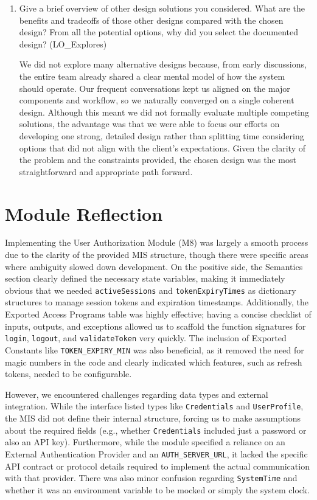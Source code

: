 \documentclass[12pt, titlepage]{article}
\begin{document}
\begin{enumerate}
  \item Give a brief overview of other design solutions you considered.  What
  are the benefits and tradeoffs of those other designs compared with the chosen
  design?  From all the potential options, why did you select the documented design?
  (LO\_Explores)

    \hspace{2em} We did not explore many alternative designs because, from early discussions, the entire team already shared a clear mental model of how the system should operate. Our frequent conversations kept us aligned on the major components and workflow, so we naturally converged on a single coherent design. Although this meant we did not formally evaluate multiple competing solutions, the advantage was that we were able to focus our efforts on developing one strong, detailed design rather than splitting time considering options that did not align with the client’s expectations. Given the clarity of the problem and the constraints provided, the chosen design was the most straightforward and appropriate path forward.

\end{enumerate}

\section*{Module Reflection}

Implementing the User Authorization Module (M8) was largely a smooth process due to the clarity of the provided MIS structure, though there were specific areas where ambiguity slowed down development. On the positive side, the Semantics section clearly defined the necessary state variables, making it immediately obvious that we needed \texttt{activeSessions} and \texttt{tokenExpiryTimes} as dictionary structures to manage session tokens and expiration timestamps. Additionally, the Exported Access Programs table was highly effective; having a concise checklist of inputs, outputs, and exceptions allowed us to scaffold the function signatures for \texttt{login}, \texttt{logout}, and \texttt{validateToken} very quickly. The inclusion of Exported Constants like \texttt{TOKEN\_EXPIRY\_MIN} was also beneficial, as it removed the need for magic numbers in the code and clearly indicated which features, such as refresh tokens, needed to be configurable.

However, we encountered challenges regarding data types and external integration. While the interface listed types like \texttt{Credentials} and \texttt{UserProfile}, the MIS did not define their internal structure, forcing us to make assumptions about the required fields (e.g., whether \texttt{Credentials} included just a password or also an API key). Furthermore, while the module specified a reliance on an External Authentication Provider and an \texttt{AUTH\_SERVER\_URL}, it lacked the specific API contract or protocol details required to implement the actual communication with that provider. There was also minor confusion regarding \texttt{SystemTime} and whether it was an environment variable to be mocked or simply the system clock.
\end{document}
